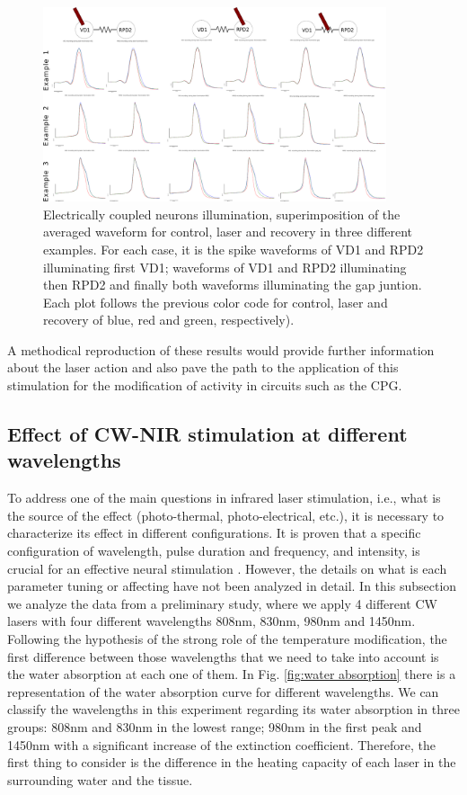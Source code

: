 \begin{figure}[hbt]
	\centering
	\includegraphics[width=0.9\textwidth]{img/laser/electrical/electrical_results_reduced.pdf}
    \caption{Electrically coupled neurons illumination, superimposition of the averaged waveform for control, laser and recovery in three different examples. For each case, it is the spike waveforms of VD1 and RPD2 illuminating first VD1; waveforms of VD1 and RPD2 illuminating then RPD2 and finally both waveforms illuminating the gap juntion. Each plot follows the previous color code for control, laser and recovery of blue, red and green, respectively).}
    \label{fig:electrical results}
\end{figure}


A methodical reproduction of these results would provide further information about the laser action and also pave the path to the application of this stimulation for the modification of activity in circuits such as the CPG. 

\subsection{Effect of CW-NIR stimulation at different wavelengths}
To address one of the main questions in infrared laser stimulation, i.e., what is the source of the effect (photo-thermal, photo-electrical, etc.), it is necessary to characterize its effect in different configurations. It is proven that a specific configuration of wavelength, pulse duration and frequency, and intensity, is crucial for an effective neural stimulation \parencite{izzo_optical_2007,wells_biophysical_2007}. However, the details on what is each parameter tuning or affecting  have not been analyzed in detail. In this subsection we analyze the data from a preliminary study, where we apply 4 different CW lasers with four different wavelengths 808nm, 830nm, 980nm and 1450nm. Following the hypothesis of the strong role of the temperature modification, the first difference between those wavelengths that we need to take into account is the water absorption at each one of them. In Fig. \ref{fig:water absorption} there is a representation of the water absorption curve for different wavelengths. We can classify the wavelengths in this experiment regarding its water absorption in three groups: 808nm and 830nm in the lowest range; 980nm in the first peak and 1450nm with a significant increase of the extinction coefficient. Therefore, the first thing to consider is the difference in the heating capacity of each laser in the surrounding water and the tissue. 

